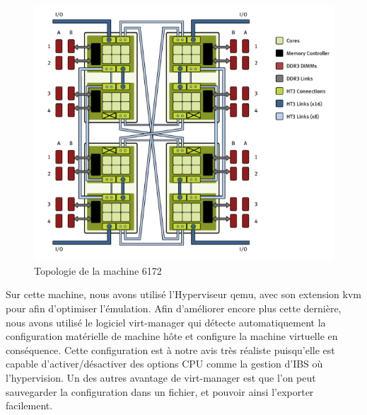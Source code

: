         \begin{figure}[H]
            \begin{center}
              \includegraphics[scale=0.4]{img/numa_arch_details.png}
              \caption{Topologie de la machine 6172}
              \label{f:numa_topology}
            \end{center}
        \end{figure}

        Sur cette machine, nous avons utilisé l'Hyperviseur qemu, avec son extension
        kvm pour afin d'optimiser l'émulation. Afin d'améliorer encore plus cette
        dernière, nous avons utilisé le logiciel virt-manager qui détecte
        automatiquement la configuration matérielle de machine hôte et configure la
        machine virtuelle en conséquence. Cette configuration est à notre avis très
        réaliste puisqu'elle est capable d'activer/désactiver des options CPU comme
        la gestion d'IBS où l'hypervision. Un des autres avantage de virt-manager
        est que l'on peut sauvegarder la configuration dans un fichier, et pouvoir
        ainsi l'exporter facilement.

